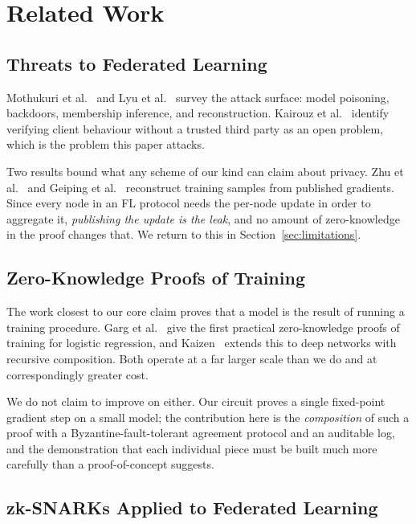 \documentclass{llncs}
\begin{document}
\section{Related Work}

\subsection{Threats to Federated Learning}

Mothukuri et al.~\cite{mothukuri2021survey} and Lyu et
al.~\cite{lyu2020threats} survey the attack surface: model poisoning, backdoors,
membership inference, and reconstruction. Kairouz et
al.~\cite{kairouz2021advances} identify verifying client behaviour without a
trusted third party as an open problem, which is the problem this paper attacks.

Two results bound what any scheme of our kind can claim about privacy. Zhu et
al.~\cite{zhu2019deepleakage} and Geiping et al.~\cite{geiping2020inverting}
reconstruct training samples from published gradients. Since every node in an FL
protocol needs the per-node update in order to aggregate it, \emph{publishing
the update is the leak}, and no amount of zero-knowledge in the proof changes
that. We return to this in Section~\ref{sec:limitations}.

\subsection{Zero-Knowledge Proofs of Training}

The work closest to our core claim proves that a model is the result of running
a training procedure. Garg et al.~\cite{garg2023zkpot} give the first practical
zero-knowledge proofs of training for logistic regression, and
Kaizen~\cite{abbaszadeh2024kaizen} extends this to deep networks with recursive
composition. Both operate at a far larger scale than we do and at
correspondingly greater cost.

We do not claim to improve on either. Our circuit proves a single fixed-point
gradient step on a small model; the contribution here is the \emph{composition}
of such a proof with a Byzantine-fault-tolerant agreement protocol and an
auditable log, and the demonstration that each individual piece must be built
much more carefully than a proof-of-concept suggests.

\subsection{zk-SNARKs Applied to Federated Learning}
\end{document}
